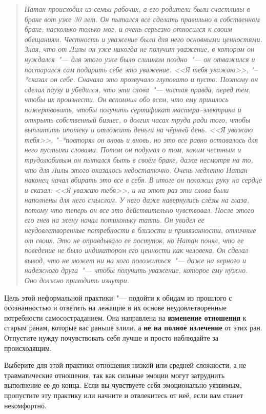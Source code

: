 \begin{quotation}
	\textit{
		Натан происходил из семьи рабочих, а его родители были счастливы в браке вот уже 30 лет. Он пытался все сделать правильно в собственном браке, насколько только мог, и очень серьезно относился к своим обещаниям. Честность и уважение были для него основными ценностями. Зная, что от Лилы он уже никогда не получит уважение, в котором он нуждался~"--- для этого уже было слишком поздно~"--- он отважился и постарался сам подарить себе это уважение. <<Я тебя уважаю>>, "--*сказал он себе. Сначала это прозвучало глуповато и пусто. Поэтому он сделал паузу и убедился, что эти слова~"--- чистая правда, перед тем, чтобы их произнести. Он вспомнил обо всем, что ему пришлось пожертвовать, чтобы получить сертификат мастера--электрика и открыть собственный бизнес, о долгих часах труда ради того, чтобы выплатить ипотеку и отложить деньги на чёрный день. <<Я уважаю тебя>>, "--*повторял он вновь и вновь, но это все равно оставалось для него пустыми словами. Потом он подумал о том, каким честным и трудолюбивым он пытался быть в своём браке, даже несмотря на то, что для Лилы этого оказалось недостаточно. Очень медленно Натан наконец начал вбирать это все в себя. В итоге он положил руку на сердце и сказал: <<Я уважаю тебя>>, и на этот раз эти слова были наполнены для него смыслом. У него даже навернулись слёзы на глаза, потому что теперь он все это действительно чувствовал. После этого его гнев на жену начал потихоньку таять. Он увидел ее неудовлетворенные потребности в близости и привязанности, отличные от своих. Это не оправдывало ее поступок, но Натан понял, что ее поведение не было индикатором его ценности как человека. Он сделал вывод, что не может ни на кого положиться~"--- даже на верного и надежного друга~"--- чтобы получить уважение, которое ему нужно. Оно должно приходить изнутри.
	} 
\end{quotation}

\newpage
{} \label{Ex:Meeting_Unmet_Needs}

Цель этой неформальной практики~"--- подойти к обидам из прошлого с осознанностью и ответить на лежащие в их основе неудовлетворенные потребности самосостраданием. Она направлена на \textbf{изменение отношения} к старым ранам, которые вас раньше злили, а \textbf{не на полное излечение} от этих ран. Отпустите нужду почувствовать себя лучше и просто наблюдайте за происходящим.

Выберите для этой практики отношения низкой или средней сложности, а не травматические отношения, так как сильные эмоции могут затруднить выполнение ее до конца. Если вы чувствуете себя эмоционально уязвимым, пропустите эту практику или начните и отвлекитесь от неё, если вам станет некомфортно.


